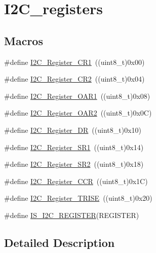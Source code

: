 \hypertarget{group___i2_c__registers}{}\section{I2\+C\+\_\+registers}
\label{group___i2_c__registers}
\subsection*{Macros}
\begin{DoxyCompactItemize}
\item 
\#define \mbox{\hyperlink{group___i2_c__registers_ga4b9e7934e490c3540e50cf2f1d0a7688}{I2\+C\+\_\+\+Register\+\_\+\+C\+R1}}~((uint8\+\_\+t)0x00)
\item 
\#define \mbox{\hyperlink{group___i2_c__registers_gaf278337dd03b6ae56eac3f335381eca3}{I2\+C\+\_\+\+Register\+\_\+\+C\+R2}}~((uint8\+\_\+t)0x04)
\item 
\#define \mbox{\hyperlink{group___i2_c__registers_ga706317a00c0d450e95c00efd2afe1836}{I2\+C\+\_\+\+Register\+\_\+\+O\+A\+R1}}~((uint8\+\_\+t)0x08)
\item 
\#define \mbox{\hyperlink{group___i2_c__registers_gaffdc1902493456dea95216a39fc54e2b}{I2\+C\+\_\+\+Register\+\_\+\+O\+A\+R2}}~((uint8\+\_\+t)0x0\+C)
\item 
\#define \mbox{\hyperlink{group___i2_c__registers_gaea281721e7a8461d90bf59898487c096}{I2\+C\+\_\+\+Register\+\_\+\+DR}}~((uint8\+\_\+t)0x10)
\item 
\#define \mbox{\hyperlink{group___i2_c__registers_gaf3bc5f4dc87513e2eceba4f503c14d6a}{I2\+C\+\_\+\+Register\+\_\+\+S\+R1}}~((uint8\+\_\+t)0x14)
\item 
\#define \mbox{\hyperlink{group___i2_c__registers_ga0b5f7949e449223ec97e0169d79d007d}{I2\+C\+\_\+\+Register\+\_\+\+S\+R2}}~((uint8\+\_\+t)0x18)
\item 
\#define \mbox{\hyperlink{group___i2_c__registers_ga7a0de765650408f3915b54141f052c5b}{I2\+C\+\_\+\+Register\+\_\+\+C\+CR}}~((uint8\+\_\+t)0x1\+C)
\item 
\#define \mbox{\hyperlink{group___i2_c__registers_ga488c25a0a9f2c572af28768589fcbab2}{I2\+C\+\_\+\+Register\+\_\+\+T\+R\+I\+SE}}~((uint8\+\_\+t)0x20)
\item 
\#define \mbox{\hyperlink{group___i2_c__registers_ga37206b258f7930065c308ec7d35f243e}{I\+S\+\_\+\+I2\+C\+\_\+\+R\+E\+G\+I\+S\+T\+ER}}(R\+E\+G\+I\+S\+T\+ER)
\end{DoxyCompactItemize}


\subsection{Detailed Description}


